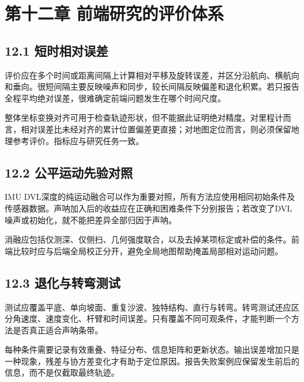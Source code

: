 \hypertarget{ux7b2cux5341ux4e8cux7ae0-ux524dux7aefux7814ux7a76ux7684ux8bc4ux4ef7ux4f53ux7cfb}{%
\section{第十二章 前端研究的评价体系}\label{ux7b2cux5341ux4e8cux7ae0-ux524dux7aefux7814ux7a76ux7684ux8bc4ux4ef7ux4f53ux7cfb}}

\hypertarget{ux77edux65f6ux76f8ux5bf9ux8befux5dee}{%
\subsection{12.1 短时相对误差}\label{ux77edux65f6ux76f8ux5bf9ux8befux5dee}}

评价应在多个时间或距离间隔上计算相对平移及旋转误差，并区分沿航向、横航向和垂向。很短间隔主要反映噪声和同步，较长间隔反映偏差和退化积累。若只报告全程平均绝对误差，很难确定前端问题发生在哪个时间尺度。

整体坐标变换对齐可用于检查轨迹形状，但不能据此证明绝对精度。对里程计而言，相对误差比未经对齐的累计位置偏差更直接；对地图定位而言，则必须保留地理参考评价。指标应与研究任务一致。

\hypertarget{ux516cux5e73ux8fd0ux52a8ux5148ux9a8cux5bf9ux7167}{%
\subsection{12.2 公平运动先验对照}\label{ux516cux5e73ux8fd0ux52a8ux5148ux9a8cux5bf9ux7167}}

IMU DVL深度的纯运动融合可以作为重要对照，所有方法应使用相同初始条件及传感器数据。声呐加入后的收益应在正确和困难条件下分别报告；若改变了DVL噪声或初始化，就不能把差异全部归因于声呐。

消融应包括仅测深、仅侧扫、几何强度联合，以及去掉某项标定或补偿的条件。前端比较时应与后端全局校正分开，避免全局地图帮助掩盖局部相对运动问题。

\hypertarget{ux9000ux5316ux4e0eux8f6cux5f2fux6d4bux8bd5}{%
\subsection{12.3 退化与转弯测试}\label{ux9000ux5316ux4e0eux8f6cux5f2fux6d4bux8bd5}}

测试应覆盖平底、单向坡面、重复沙波、独特结构、直行与转弯。转弯测试还应区分角速度、速度变化、杆臂和时间误差。只有覆盖不同可观条件，才能判断一个方法是否真正适合声呐条带。

每种条件需要记录有效重叠、特征分布、信息矩阵和更新状态。输出误差增加只是一种现象，残差与协方差变化才有助于定位原因。报告失败案例应保留发生前后的信息，而不是仅截取最终轨迹。

